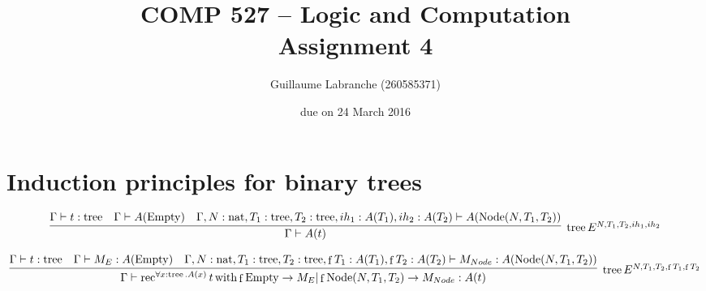 \documentclass{article}
\author{Guillaume Labranche (260585371)}
\title{COMP 527 -- Logic and Computation\\Assignment 4}
\date{due on 24 March 2016}
\newcommand{\proves}{\vdash}
\newcommand{\GV}{\Gamma \proves}
\DeclareMathOperator{\tree}{tree}
\DeclareMathOperator{\Empty}{Empty}
\DeclareMathOperator{\Node}{Node}
\DeclareMathOperator{\nat}{nat}
\DeclareMathOperator{\f}{f}
\DeclareMathOperator{\rec}{rec}
\DeclareMathOperator{\with}{with}
\begin{document}
\maketitle

\section{Induction principles for binary trees}
\begin{enumerate}
{\small \item \[
\infer[\tree E^{N,T_1,T_2,ih_1,ih_2}]
  {\GV A(t)}
  {\GV t : \tree
   & \GV A(\Empty)
   & \Gamma,N:\nat,T_1:\tree,T_2:\tree,ih_1 : A(T_1), ih_2 : A(T_2) \proves A(\Node(N,T_1,T_2))}
\] }

{\footnotesize \item \[
\infer[\tree E^{N,T_1,T_2,\f T_1,\f T_2}]
  {\GV \rec^{\forall x:\tree.A(x)} t \with \f \Empty \to M_E | \f \Node(N,T_1,T_2) \to M_{Node} : A(t)}
  {\GV t : \tree
   & \GV M_E : A(\Empty)
   & \Gamma,N:\nat,T_1:\tree,T_2:\tree,\f T_1 : A(T_1),\f T_2 : A(T_2) \proves M_{Node} : A(\Node(N,T_1,T_2))}
\]}

\end{enumerate}
\end{document}
